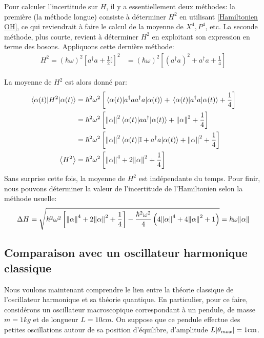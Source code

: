 \documentclass[11pt,oneside,a4paper]{article}
\newcommand{\h}{\ensuremath{\hbar}}
\begin{document}
Pour calculer l'incertitude sur $H$, il y a essentiellement deux méthodes: la première (la méthode longue) consiste à déterminer $H^2$ en utilisant \eqref{Hamiltonien OH}, ce qui reviendrait à faire le calcul de la moyenne de $X^4,P^4$, etc. La seconde méthode, plus courte, revient à déterminer $H^2$ en exploitant son expression en terme des bosons. Appliquons cette dernière méthode:
\begin{align}
  H^2 = \left(\h\omega\right)^2\left[a^\dagger a+\frac{1}{2}\mathbb{I}\right]^2 &= \left(\h\omega\right)^2\left[\left(a^\dagger a\right)^2+a^\dagger a+\frac{1}{4}\right]
\end{align}

La moyenne de $H^2$ est alors donné par:
\begin{align}
  \expval{H^2}{\alpha(t)} &= \h^2\omega^2\left[\expval{a^\dagger a a^\dagger a}{\alpha(t)}+\expval{a^\dagger a}{\alpha(t)}+\frac{1}{4}\right]\\
  &= \h^2\omega^2\left[\norm{\alpha}^2\expval{aa^\dagger}{\alpha(t)}+\norm{\alpha}^2+\frac{1}{4}\right]\\
  &= \h^2\omega^2\left[\norm{\alpha}^2\expval{\mathbb{I}+a^\dagger a}{\alpha(t)}+\norm{\alpha}^2+\frac{1}{4}\right]\\
  \expval{H^2}&= \h^2\omega^2\left[\norm{\alpha}^4+2\norm{\alpha}^2+\frac{1}{4}\right]
\end{align}
Sans surprise cette fois, la moyenne de $H^2$ est indépendante du temps. Pour finir, nous pouvons déterminer la valeur de l'incertitude de l'Hamiltonien selon la méthode usuelle:
\begin{align}
  \Delta H = \sqrt{\h^2\omega^2\left[\norm{\alpha}^4+2\norm{\alpha}^2+\frac{1}{4}\right]-\frac{\h^2\omega^2}{4}\left(4\norm{\alpha}^4+4\norm{\alpha}^2+1\right)} = \h\omega\norm{\alpha}
\end{align}

\subsection{Comparaison avec un oscillateur harmonique classique}

Nous voulons maintenant comprendre le lien entre la théorie classique de l'oscillateur harmonique et sa théorie quantique. En particulier, pour ce faire, considérons un oscillateur macroscopique correspondant à un pendule, de masse $m=1\si{kg}$ et de longueur $L = 10\si{cm}$. On suppose que ce pendule effectue des petites oscillations autour de sa position d'équilibre, d'amplitude $L\absolutevalue{\theta_{max}}=1\si{cm}$.
\end{document}
